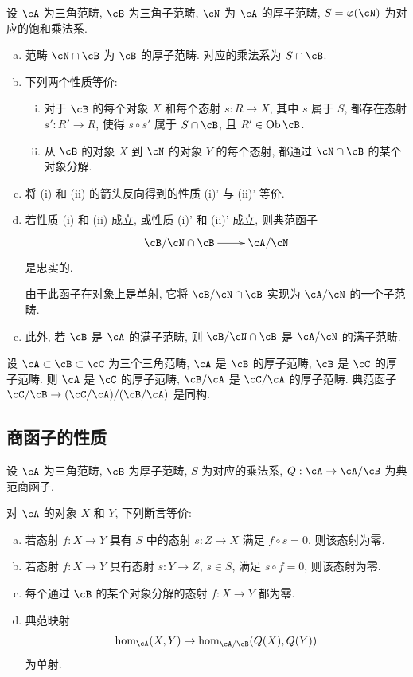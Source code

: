 \begin{theorem}\label{VIII:2-4-2}
设 $\cA$ 为三角范畴, $\cB$ 为三角子范畴, $\cN$ 为 $\cA$ 的厚子范畴, $S=\varphi(\cN)$ 为对应的饱和乘法系.
\begin{enumerate}[(a)]
  \item 范畴 $\cN\cap\cB$ 为 $\cB$ 的厚子范畴. 对应的乘法系为 $S\cap \cB$.
  \item 下列两个性质等价:
    \begin{enumerate}[(i)]
      \item 对于 $\cB$ 的每个对象 $X$ 和每个态射 $s:R\to X$, 其中 $s$ 属于 $S$, 都存在态射 $s':R'\to R$, 使得 $s\circ s'$ 属于 $S\cap \cB$, 且 $R'\in\operatorname{Ob}\cB$.
      \item 从 $\cB$ 的对象 $X$ 到 $\cN$ 的对象 $Y$ 的每个态射, 都通过 $\cN\cap \cB$ 的某个对象分解.
    \end{enumerate}
  \item 将 (i) 和 (ii) 的箭头反向得到的性质 (i)' 与 (ii)' 等价.
  \item 若性质 (i) 和 (ii) 成立, 或性质 (i)' 和 (ii)' 成立, 则典范函子
    \[\xymatrix{
      \cB/\cN\cap \cB \ar[r] & \cA/\cN
    }\]
    是忠实的.

    由于此函子在对象上是单射, 它将 $\cB/\cN\cap\cB$ 实现为 $\cA/\cN$ 的一个子范畴.
  \item 此外, 若 $\cB$ 是 $\cA$ 的满子范畴, 则 $\cB/\cN\cap \cB$ 是 $\cA/\cN$ 的满子范畴.
\end{enumerate}
\end{theorem}

\begin{corollary}\label{VIII:2-4-3}
设 $\cA\subset \cB\subset \cC$ 为三个三角范畴, $\cA$ 是 $\cB$ 的厚子范畴, $\cB$ 是 $\cC$ 的厚子范畴. 则 $\cA$ 是 $\cC$ 的厚子范畴, $\cB/\cA$ 是 $\cC/\cA$ 的厚子范畴. 典范函子 $\cC/\cB \to (\cC/\cA)/(\cB/\cA)$ 是同构.
\end{corollary}

\subsection{商函子的性质}\label{VIII:2-5}

设 $\cA$ 为三角范畴, $\cB$ 为厚子范畴, $S$ 为对应的乘法系, $Q:\cA\to \cA/\cB$ 为典范商函子.

\begin{proposition}\label{VIII:2-5-1}
对 $\cA$ 的对象 $X$ 和 $Y$, 下列断言等价:
\begin{enumerate}[(a)]
  \item 若态射 $f:X\to Y$ 具有 $S$ 中的态射 $s:Z\to X$ 满足 $f\circ s=0$, 则该态射为零.
  \item 若态射 $f:X\to Y$ 具有态射 $s:Y\to Z$, $s\in S$, 满足 $s\circ f=0$, 则该态射为零.
  \item 每个通过 $\cB$ 的某个对象分解的态射 $f:X\to Y$ 都为零.
  \item 典范映射
    \[
      \hom_\cA(X,Y) \to \hom_{\cA/\cB}(Q(X),Q(Y))
    \]
    为单射.
\end{enumerate}
\end{proposition}

